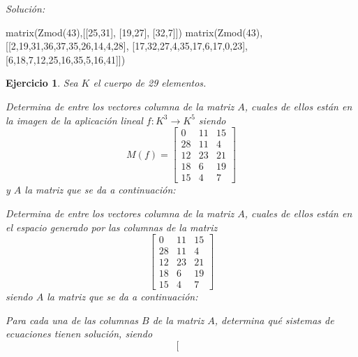\documentclass[12pt]{amsart}
\newtheorem{ejer}{Ejercicio}
\begin{document}
{\it Soluci\'on:}

\begin{sageblock}
matrix(Zmod(43),[[25,31],
[19,27],
[32,7]])
matrix(Zmod(43),[[2,19,31,36,37,35,26,14,4,28],
[17,32,27,4,35,17,6,17,0,23],
[6,18,7,12,25,16,35,5,16,41]])
\end{sageblock}



\begin{ejer} Sea $K$ el cuerpo de 29 elementos.
\newline
\noindent\begin{minipage}{\textwidth}
\begin{tcolorbox}[colback = green!20!white,title=Versión Núcleo]
Determina de entre los vectores columna de la matriz $A$, cuales de ellos están en la imagen de la aplicación lineal $f:K^{3} \to K^{5}$ siendo  $$ M(f) = \left[\begin{array}{rrr}
0 & 11 & 15 \\
28 & 11 & 4 \\
12 & 23 & 21 \\
18 & 6 & 19 \\
15 & 4 & 7
\end{array}\right] $$ y $A$ la matriz que se da a continuación:\end{tcolorbox}
\end{minipage} \newline
\noindent\begin{minipage}{\textwidth}
\begin{tcolorbox}[colback = blue!20!white,title=Versión Anulador]
Determina de entre los vectores columna de la matriz $A$, cuales de ellos están en el espacio generado por las columnas de la matriz $$ \left[\begin{array}{rrr}
0 & 11 & 15 \\
28 & 11 & 4 \\
12 & 23 & 21 \\
18 & 6 & 19 \\
15 & 4 & 7
\end{array}\right] $$ siendo $A$ la matriz que se da a continuación:\end{tcolorbox}
\end{minipage} \newline
\noindent\begin{minipage}{\textwidth} 
\begin{tcolorbox}[colback = red!20!white,title=Versión Ecuaciones Implícitas]
Para cada una de las columnas $B$ de la matriz $A$, determina qué sistemas de ecuaciones tienen solución, siendo $$ \left[\begin{array}{rrr}

\end{array}$$
\end{tcolorbox}
\end{minipage}
\end{ejer}
\end{document}
